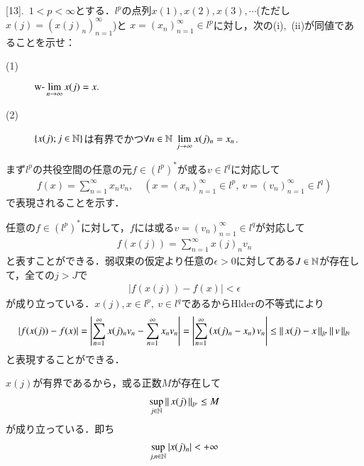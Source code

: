 [13].\ $1 < p < \infty$とする．$l^p$の点列$x(1),x(2),x(3),\cdots$(ただし$x(j)=\left(x(j)_n\right)_{n=1}^{\infty}$)と
$x=(x_n)_{n=1}^{\infty} \in l^p$に対し，次の(i),\ (ii)が同値であることを示せ：
\begin{description}
	\item[(1)] $\displaystyle \mbox{w-}\lim_{n \to \infty} x(j) = x.$
	\item[(2)] $\left\{x(j);j\in\mathbb{N}\right\}$は有界でかつ$\forall n \in \mathbb{N}\ \displaystyle \lim_{j \to \infty}x(j)_n = x_n$.
\end{description}

\begin{prf}
\begin{description}\mbox{}
	\item[$l^p$の共役空間] まず$l^p$の共役空間の任意の元$f \in \left(l^p\right)^*$が或る$v \in l^q$に対応して
		\begin{align}
			f(x) = \sum_{n=1}^{\infty} x_n v_n, \quad \left(x = (x_n)_{n=1}^{\infty} \in l^p,\ v = (v_n)_{n=1}^{\infty} \in l^q\right)
		\end{align}
		で表現されることを示す．
	\item[(1) $\Rightarrow$ (2)] 任意の$f \in \left(l^p\right)^*$に対して，$f$には或る$v = (v_n)_{n=1}^{\infty} \in l^q$が対応して
		\begin{align}
			f(x(j)) = \sum_{n=1}^{\infty} x(j)_n v_n
		\end{align}
		と表すことができる．弱収束の仮定より任意の$\epsilon > 0$に対してある$J \in \mathbb{N}$が存在して，全ての$j > J$で
		\begin{align}
			|f(x(j)) - f(x)| < \epsilon
		\end{align}
		が成り立っている．$x(j),x \in l^p,\ v \in l^q$であるからHlderの不等式により
		\begin{align}
			|f(x(j)) - f(x)| = \left|\sum_{n=1}^{\infty} x(j)_n v_n - \sum_{n=1}^{\infty} x_n v_n  \right|
			= \left|\sum_{n=1}^{\infty} \left(x(j)_n - x_n\right) v_n \right|
			\leq \left\|\, x(j) - x\, \right\|_{l^p}\left\|\, v\, \right\|_{l^q}
		\end{align}
		と表現することができる．
	\item[(2) $\Rightarrow$ (1)] $x(j)$が有界であるから，或る正数$M$が存在して
		\begin{align}
			\operatorname*{sup}_{j \in \mathbb{N}} \left\|\, x(j)\, \right\|_{l^p} \leq M
		\end{align}
		が成り立っている．即ち
		\begin{align}
			\operatorname*{sup}_{j,n \in \mathbb{N}} \left|x(j)_n\right| < +\infty
		\end{align}

\end{description}
\end{prf}
